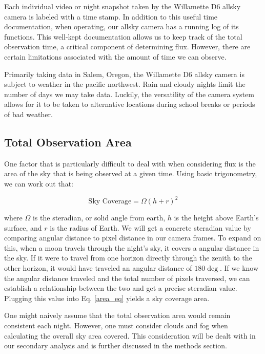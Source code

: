 Each individual video or night snapshot taken by the Willamette D6 allsky camera is labeled with a time stamp.  
In addition to this useful time documentation, when operating, our allsky camera has a running log of its functions.
This well-kept documentation allows us to keep track of the total observation time, a critical component of determining flux.  
However, there are certain limitations associated with the amount of time we can observe.

Primarily taking data in Salem, Oregon, the Willamette D6 allsky camera is subject to weather in the pacific northwest.  
Rain and cloudy nights limit the number of days we may take data.
Luckily, the versatility of the camera system allows for it to be taken to alternative locations during school breaks or periods of bad weather.


\subsection{Total Observation Area}
One factor that is particularly difficult to deal with when considering flux is the area of the sky that is being observed at a given time.
Using basic trigonometry, we can work out that:

\begin{equation}
    \text{Sky Coverage} = \Omega(h+r)^2
    \label{area_eq}
\end{equation}

where $\Omega$ is the steradian, or solid angle from earth, $h$ is the height above Earth's surface, and $r$ is the radius of Earth.
We will get a concrete steradian value by comparing angular distance to pixel distance in our camera frames.
To expand on this, when a moon travels through the night's sky, it covers a angular distance in the sky.  
If it were to travel from one horizon directly through the zenith to the other horizon, it would have traveled an angular distance of $180 \deg$.  
If we know the angular distance traveled and the total number of pixels traversed, we can establish a relationship between the two and get a precise steradian value.
Plugging this value into Eq. \ref{area_eq} yields a sky coverage area.

One might naively assume that the total observation area would remain consistent each night.
However, one must consider clouds and fog when calculating the overall sky area covered.
This consideration will be dealt with in our secondary analysis and is further discussed in the methods section.
